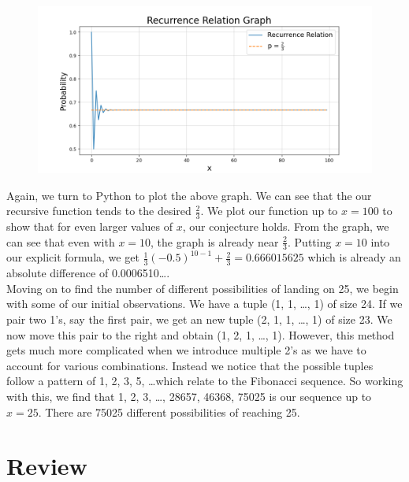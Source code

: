 \documentclass[11pt]{article}
\newcommand{\keywordfont}{\textsc}
\newcommand{\keyword}[1]{%
  \marginpar{\raggedright\small\keywordfont{#1}}}
\begin{document}
\begin{figure}[h]
   \centering
   \includegraphics[width=5.5in]{RRgraph.png}
   \label{myfig}
\end{figure}

Again, we \keyword{Check} turn to Python to plot the above graph. We can see that the our recursive function tends to the desired $\frac{2}{3}$. We plot our function up to $x=100$ to show that for even larger values of $x$, our conjecture holds. From the graph, we can see that even with $x=10$, the graph is already near $\frac{2}{3}$. Putting $x=10$ into our explicit formula, we get $\frac{1}{3}(-0.5)^{10-1}+\frac{2}{3} = 0.666015625$ which is already an absolute difference of 0.0006510\dots .\\


Moving on to find the number of different possibilities of landing on 25, we begin with some of our initial observations. We have a tuple (1, 1, \dots, 1) of size 24. If we pair two 1's, say the first pair, we get an new tuple (2, 1, 1, \dots, 1) of size 23. We now move this pair to the right and obtain (1, 2, 1, \dots, 1). However, this method gets much more complicated when we introduce multiple 2's as we have to account for various combinations. Instead we notice that the possible tuples follow a pattern of 1, 2, 3, 5, \dots which relate to the Fibonacci sequence. So working with this, we find that 1, 2, 3, \dots, 28657, 46368, 75025 is our sequence up to $x=25$. There are 75025 different possibilities of reaching 25.


\section{Review} %
\end{document}
